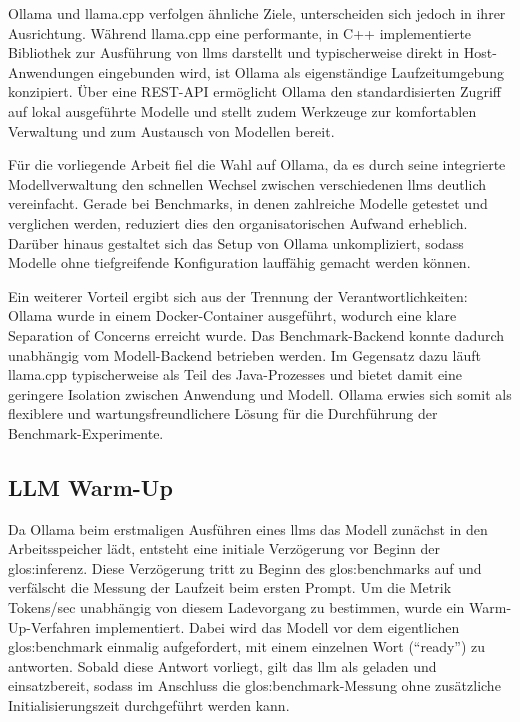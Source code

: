 Ollama und llama.cpp verfolgen ähnliche Ziele, unterscheiden sich jedoch in ihrer Ausrichtung.
Während llama.cpp eine performante, in C++ implementierte Bibliothek zur Ausführung von \glspl{llm} darstellt und typischerweise direkt in Host-Anwendungen eingebunden wird, ist Ollama als eigenständige Laufzeitumgebung konzipiert.
Über eine REST-API ermöglicht Ollama den standardisierten Zugriff auf lokal ausgeführte Modelle und stellt zudem Werkzeuge zur komfortablen Verwaltung und zum Austausch von Modellen bereit.

Für die vorliegende Arbeit fiel die Wahl auf Ollama, da es durch seine integrierte Modellverwaltung den schnellen Wechsel zwischen verschiedenen \glspl{llm} deutlich vereinfacht.
Gerade bei Benchmarks, in denen zahlreiche Modelle getestet und verglichen werden, reduziert dies den organisatorischen Aufwand erheblich.
Darüber hinaus gestaltet sich das Setup von Ollama unkompliziert, sodass Modelle ohne tiefgreifende Konfiguration lauffähig gemacht werden können.

Ein weiterer Vorteil ergibt sich aus der Trennung der Verantwortlichkeiten: Ollama wurde in einem Docker-Container ausgeführt, wodurch eine klare Separation of Concerns erreicht wurde.
Das Benchmark-Backend konnte dadurch unabhängig vom Modell-Backend betrieben werden.
Im Gegensatz dazu läuft llama.cpp typischerweise als Teil des Java-Prozesses und bietet damit eine geringere Isolation zwischen Anwendung und Modell.
Ollama erwies sich somit als flexiblere und wartungsfreundlichere Lösung für die Durchführung der Benchmark-Experimente.


\subsection{LLM Warm-Up}\label{subsec:llm-warm-up}

Da Ollama beim erstmaligen Ausführen eines \glspl{llm} das Modell zunächst in den Arbeitsspeicher lädt, entsteht eine initiale Verzögerung vor Beginn der \gls{glos:inferenz}.
Diese Verzögerung tritt zu Beginn des \gls{glos:benchmark}s auf und verfälscht die Messung der Laufzeit beim ersten Prompt.
Um die Metrik Tokens/sec unabhängig von diesem Ladevorgang zu bestimmen, wurde ein Warm-Up-Verfahren implementiert.
Dabei wird das Modell vor dem eigentlichen \gls{glos:benchmark} einmalig aufgefordert, mit einem einzelnen Wort (\enquote{ready}) zu antworten.
Sobald diese Antwort vorliegt, gilt das \gls{llm} als geladen und einsatzbereit, sodass im Anschluss die \gls{glos:benchmark}-Messung ohne zusätzliche Initialisierungszeit durchgeführt werden kann.

